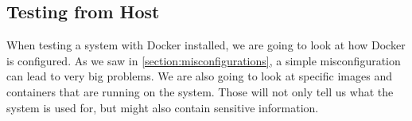 \subsection{Testing from Host}

When testing a system with Docker installed, we are going to look at how Docker is configured. As we saw in \autoref{section:misconfigurations}, a simple misconfiguration can lead to very big problems. We are also going to look at specific images and containers that are running on the system. Those will not only tell us what the system is used for, but might also contain sensitive information.






